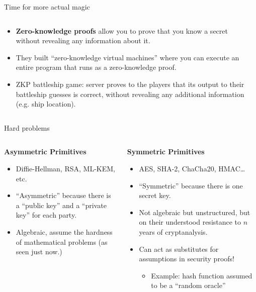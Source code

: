 \documentclass[aspectratio=169, lualatex, handout]{beamer}
\begin{document}
\begin{frame}{Time for more actual magic}
	\begin{columns}[c]
		\begin{column}{0.6\textwidth}
			\begin{itemize}[<+->]
				\item \textbf{Zero-knowledge proofs} allow you to prove that you know
				      a secret without revealing any information about it.
				\item They built ``zero-knowledge virtual machines'' where you can execute
				      an entire program that runs as a zero-knowledge proof.
				\item ZKP battleship game: server proves to the players that its
				      output to their battleship guesses is correct, without revealing any
				      additional information (e.g. ship location).
			\end{itemize}
		\end{column}

		\begin{column}{0.4\textwidth}
		\end{column}
	\end{columns}
\end{frame}

\begin{frame}{Hard problems}
	\begin{columns}[c]
		\begin{column}{0.5\textwidth}
			\textbf{Asymmetric Primitives}
			\begin{itemize}[<+->]
				\item Diffie-Hellman, RSA, ML-KEM, etc.
				\item ``Asymmetric'' because there is a ``public key'' and a ``private
				      key'' for each party.
				\item Algebraic, assume the hardness of mathematical problems (as seen
				      just now.)
			\end{itemize}
		\end{column}

		\begin{column}{0.5\textwidth}
			\textbf{Symmetric Primitives}
			\begin{itemize}[<+->]
				\item AES, SHA-2, ChaCha20, HMAC\ldots
				\item ``Symmetric'' because there is one secret key.
				\item Not algebraic but unstructured, but on their understood
				      resistance to $n$ years of cryptanalysis.
				\item Can act as substitutes for assumptions in security proofs!
				      \begin{itemize}
					      \item Example: hash function assumed to be a ``random oracle''
				      \end{itemize}
			\end{itemize}
		\end{column}
	\end{columns}
\end{frame}
\end{document}
